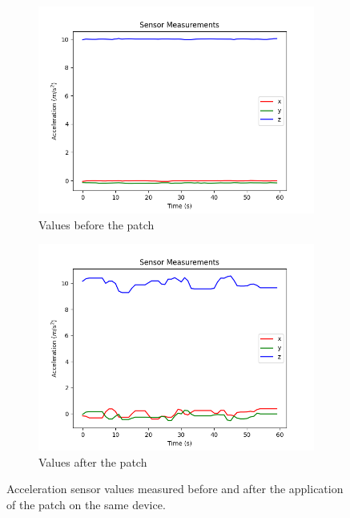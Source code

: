 \documentclass[11pt,
  oneside,openany,    %
]{scrreprt}
\begin{document}
\begin{figure}[h]
  \centering
  \captionsetup{justification=centering}
  \begin{subfigure}[b]{0.49\textwidth}
    \centering
    \includegraphics[width=\textwidth]{figures/SensorValuesBefore.png}
    \caption{Values before the patch}
  \end{subfigure}
  \hfill
  \begin{subfigure}[b]{0.49\textwidth}
    \centering
    \includegraphics[width=\textwidth]{figures/SensorValuesAfter.png}
    \caption{Values after the patch}
  \end{subfigure}
  \caption{Acceleration sensor values measured before and after the application of the patch on the same device.}
  \label{fig:values}
\end{figure}
\end{document}
